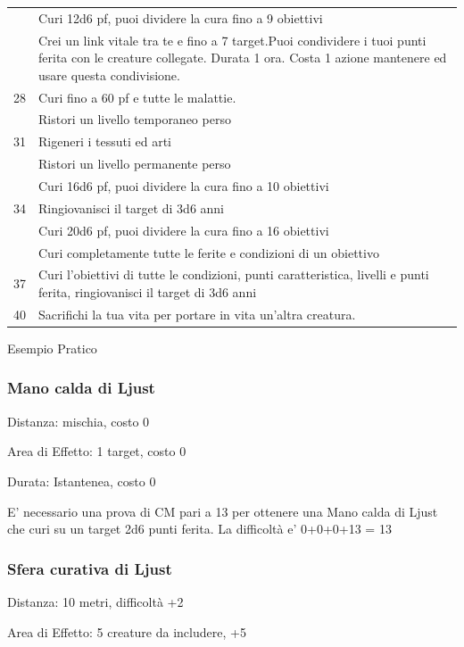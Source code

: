 \documentclass[a4paper,11pt,twoside,openany]{book}
\begin{document}
\begin{tabularx}{0.95\textwidth}{lX}
           & Curi 12d6 pf, puoi dividere la cura fino a 9 obiettivi \\
           & Crei un link vitale tra te e fino a 7 target.Puoi condividere i tuoi punti ferita con le creature collegate. Durata 1 ora. Costa 1 azione mantenere ed usare questa condivisione.  \\
	28     & Curi fino a 60 pf e tutte le malattie. \\
           & Ristori un livello temporaneo perso \\
	31     & Rigeneri i tessuti ed arti\\
           & Ristori un livello permanente perso\\
           & Curi 16d6 pf, puoi dividere la cura fino a 10 obiettivi\\
	34     & Ringiovanisci il target di 3d6 anni\\
           & Curi 20d6 pf, puoi dividere la cura fino a 16 obiettivi\\
           & Curi completamente tutte le ferite e condizioni di un obiettivo\\
	37     & Curi l'obiettivi di tutte le condizioni, punti caratteristica, livelli e punti ferita, ringiovanisci il target di 3d6 anni \\
	40     & Sacrifichi la tua vita per portare in vita un’altra creatura.\\
\end{tabularx}
\bigskip

Esempio Pratico

\subsubsection{Mano calda di Ljust}

Distanza: mischia, costo 0

Area di Effetto: 1 target, costo 0

Durata: Istantenea, costo 0

E’ necessario una prova di CM pari a 13 per ottenere una Mano calda di Ljust che curi su un target
2d6 punti ferita. La difficoltà e’ 0+0+0+13 = 13

\subsubsection{Sfera curativa di Ljust}

Distanza: 10 metri, difficoltà +2

Area di Effetto: 5 creature da includere, +5
\end{document}
